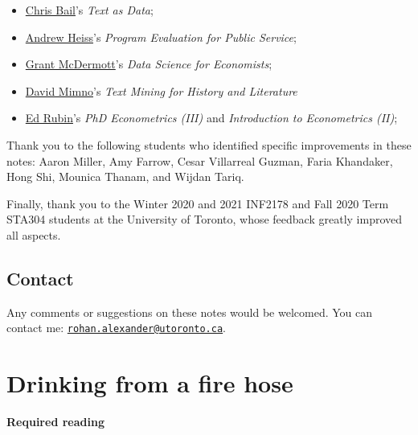 \documentclass[
]{book}
\providecommand{\tightlist}{%
  \setlength{\itemsep}{0pt}\setlength{\parskip}{0pt}}
\begin{document}
\begin{itemize}
\tightlist
\item
  \href{https://cbail.github.io/textasdata/Text_as_Data.html}{Chris Bail}'s \emph{Text as Data};
\item
  \href{https://www.andrewheiss.com/}{Andrew Heiss}'s \emph{Program Evaluation for Public Service};
\item
  \href{https://grantmcdermott.com/}{Grant McDermott}'s \emph{Data Science for Economists};
\item
  \href{https://mimno.infosci.cornell.edu/info3350/}{David Mimno}'s \emph{Text Mining for History and Literature}
\item
  \href{http://edrub.in/}{Ed Rubin}'s \emph{PhD Econometrics (III)} and \emph{Introduction to Econometrics (II)};
\end{itemize}

Thank you to the following students who identified specific improvements in these notes: Aaron Miller, Amy Farrow, Cesar Villarreal Guzman, Faria Khandaker, Hong Shi, Mounica Thanam, and Wijdan Tariq.

Finally, thank you to the Winter 2020 and 2021 INF2178 and Fall 2020 Term STA304 students at the University of Toronto, whose feedback greatly improved all aspects.

\hypertarget{contact}{%
\section{Contact}\label{contact}}

Any comments or suggestions on these notes would be welcomed. You can contact me: \href{mailto:rohan.alexander@utoronto.ca}{\nolinkurl{rohan.alexander@utoronto.ca}}.

\hypertarget{drinking-from-a-fire-hose}{%
\chapter{Drinking from a fire hose}\label{drinking-from-a-fire-hose}}

\textbf{Required reading}
\end{document}
